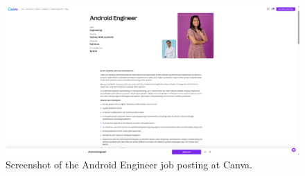\documentclass{article}
\begin{document}
\vspace{1cm}
\begin{figure}[h!]
    \centering
    \includegraphics[width=\textwidth]{../job_posting.png}
    \caption{Screenshot of the Android Engineer job posting at Canva.}
    \label{fig:Job Ad Canva }
\end{figure}
\end{document}
